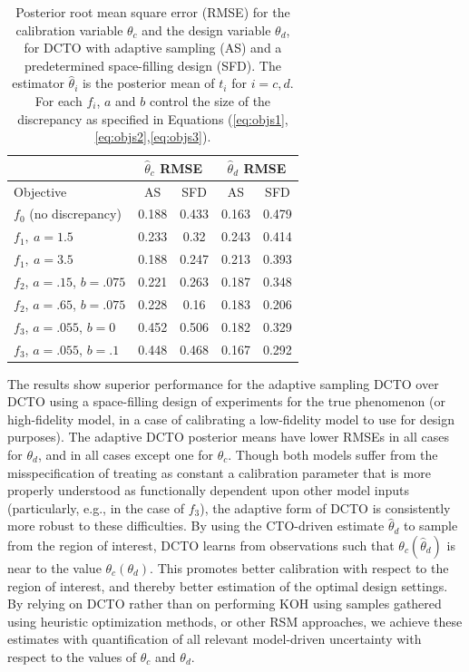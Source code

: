 \documentclass[10pt]{asme2ej}
\begin{document}
%
\begin{table}[]
	\centering
	\captionsetup{width=.85\linewidth}
	\caption{Posterior root mean square error (RMSE) for the calibration variable $\theta_c$ and the design variable $\theta_d$, for DCTO with adaptive sampling (AS) and a predetermined space-filling design (SFD). The estimator $\widehat{\theta}_i$ is the posterior mean of $t_i$ for $i=c,d$. For each $f_i$, $a$ and $b$ control the size of the discrepancy as specified in Equations (\ref{eq:objs1},\ref{eq:objs2},\ref{eq:objs3}).} 
	\renewcommand{\arraystretch}{1.2}%
	\begin{tabular}{l|cc|cc}
		&\multicolumn{2}{c|}{$\widehat\theta_c$ RMSE}&
		\multicolumn{2}{c}{$\widehat\theta_d$ RMSE} \\ \hline
		Objective    & AS   & SFD & AS    & SFD   \\ \hline
		$f_0$ (no discrepancy)             & 0.188 & 0.433 & 0.163 & 0.479\\ \hline
		$f_1,\ a=1.5$       & 0.233 & 0.32 & 0.243 & 0.414\\ \hline
		$f_1,\ a=3.5$       & 0.188 & 0.247 & 0.213 & 0.393\\ \hline
		$f_2$, $a=.15$, $b=.075$       & 0.221 & 0.263 & 0.187 & 0.348\\ \hline
		$f_2$, $a=.65$, $b=.075$       & 0.228 & 0.16 & 0.183 & 0.206\\ \hline
		$f_3$, $a=.055$, $b=0$       & 0.452 & 0.506 & 0.182 & 0.329\\ \hline
		$f_3$, $a=.055$, $b=.1$       & 0.448 & 0.468 & 0.167 & 0.292\\ \hline
	\end{tabular}
	
	\label{table:vars_and_rmses}
\end{table}
%

%
The results show superior performance for the adaptive sampling DCTO over DCTO using a space-filling design of experiments for the true phenomenon (or high-fidelity model, in a case of calibrating a low-fidelity model to use for design purposes).
%
The adaptive DCTO posterior means have lower RMSEs in all cases for $\theta_d$, and in all cases except one for $\theta_c$.
%
Though both models suffer from the misspecification of treating as constant a calibration parameter that is more properly understood as functionally dependent upon other model inputs (particularly, e.g., in the case of $f_3$), the adaptive form of DCTO is consistently more robust to these difficulties.
%
By using the CTO-driven estimate $\widehat\theta_d$ to sample from the region of interest, DCTO learns from observations such that $\theta_c(\widehat\theta_d)$ is near to the value $\theta_c(\theta_d)$.
%
This promotes better calibration with respect to the region of interest, and thereby better estimation of the optimal design settings.
%
By relying on DCTO rather than on performing KOH using samples gathered using heuristic optimization methods, or other RSM approaches, we achieve these estimates with quantification of all relevant model-driven uncertainty with respect to the values of $\theta_c$ and $\theta_d$.
%
\end{document}
